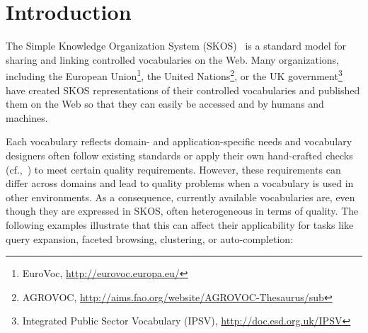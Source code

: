 
\section{Introduction}\label{sec:introduction}


The Simple Knowledge Organization System (SKOS)~\cite{Miles2005} is a standard model for sharing and linking controlled vocabularies on the Web. Many organizations, including the European Union\footnote{EuroVoc, \url{http://eurovoc.europa.eu/}}, the United Nations\footnote{AGROVOC, \url{http://aims.fao.org/website/AGROVOC-Thesaurus/sub}}, or the UK government\footnote{Integrated Public Sector Vocabulary (IPSV), \url{http://doc.esd.org.uk/IPSV}} have created SKOS representations of their controlled vocabularies and published them on the Web so that they can easily be accessed and by humans and machines.

Each vocabulary reflects domain- and application-specific needs and vocabulary designers often follow existing standards \cite{ISO25964-1:2011,Z39.19:2005} or apply their own hand-crafted checks (cf.,~\cite{Coronado2009}) to meet certain quality requirements. However, these requirements can differ across domains and lead to quality problems when a vocabulary is used in other environments. As a consequence, currently available vocabularies are, even though they are expressed in SKOS, often heterogeneous in terms of quality. The following examples illustrate that this can affect their applicability for tasks like query expansion, faceted browsing, clustering, or auto-completion: 

